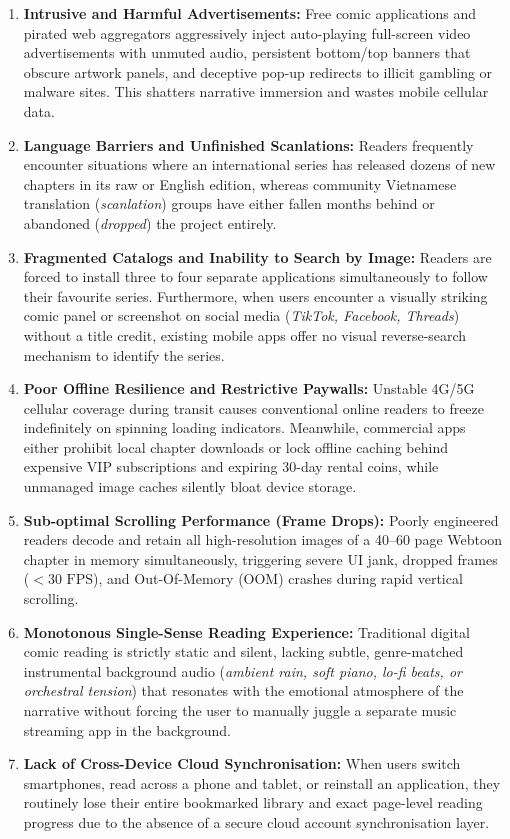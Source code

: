 \begin{enumerate}[label=\textbf{Pain Point \arabic*:}, wide=0pt, leftmargin=1.6em]
    \item \textbf{Intrusive and Harmful Advertisements:} Free comic applications and pirated web aggregators aggressively inject auto-playing full-screen video advertisements with unmuted audio, persistent bottom/top banners that obscure artwork panels, and deceptive pop-up redirects to illicit gambling or malware sites. This shatters narrative immersion and wastes mobile cellular data.
    \item \textbf{Language Barriers and Unfinished Scanlations:} Readers frequently encounter situations where an international series has released dozens of new chapters in its raw or English edition, whereas community Vietnamese translation (\textit{scanlation}) groups have either fallen months behind or abandoned (\textit{dropped}) the project entirely.
    \item \textbf{Fragmented Catalogs and Inability to Search by Image:} Readers are forced to install three to four separate applications simultaneously to follow their favourite series. Furthermore, when users encounter a visually striking comic panel or screenshot on social media (\textit{TikTok, Facebook, Threads}) without a title credit, existing mobile apps offer no visual reverse-search mechanism to identify the series.
    \item \textbf{Poor Offline Resilience and Restrictive Paywalls:} Unstable 4G/5G cellular coverage during transit causes conventional online readers to freeze indefinitely on spinning loading indicators. Meanwhile, commercial apps either prohibit local chapter downloads or lock offline caching behind expensive VIP subscriptions and expiring 30-day rental coins, while unmanaged image caches silently bloat device storage.
    \item \textbf{Sub-optimal Scrolling Performance (Frame Drops):} Poorly engineered readers decode and retain all high-resolution images of a 40--60 page Webtoon chapter in memory simultaneously, triggering severe UI jank, dropped frames ($< 30\text{ FPS}$), and Out-Of-Memory (OOM) crashes during rapid vertical scrolling.
    \item \textbf{Monotonous Single-Sense Reading Experience:} Traditional digital comic reading is strictly static and silent, lacking subtle, genre-matched instrumental background audio (\textit{ambient rain, soft piano, lo-fi beats, or orchestral tension}) that resonates with the emotional atmosphere of the narrative without forcing the user to manually juggle a separate music streaming app in the background.
    \item \textbf{Lack of Cross-Device Cloud Synchronisation:} When users switch smartphones, read across a phone and tablet, or reinstall an application, they routinely lose their entire bookmarked library and exact page-level reading progress due to the absence of a secure cloud account synchronisation layer.
\end{enumerate}

